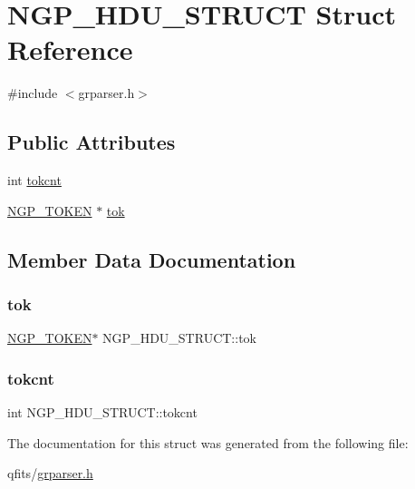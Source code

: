 \hypertarget{struct_n_g_p___h_d_u___s_t_r_u_c_t}{}\section{N\+G\+P\+\_\+\+H\+D\+U\+\_\+\+S\+T\+R\+U\+CT Struct Reference}
\label{struct_n_g_p___h_d_u___s_t_r_u_c_t}


{\ttfamily \#include $<$grparser.\+h$>$}

\subsection*{Public Attributes}
\begin{DoxyCompactItemize}
\item 
int \hyperlink{struct_n_g_p___h_d_u___s_t_r_u_c_t_a4bbc26892d6f45f03be904789ab45202}{tokcnt}
\item 
\hyperlink{grparser_8h_ab57b894304091236ced9238b8a7e21fd}{N\+G\+P\+\_\+\+T\+O\+K\+EN} $\ast$ \hyperlink{struct_n_g_p___h_d_u___s_t_r_u_c_t_a6c7032fdd7f78138bc39109632805c6b}{tok}
\end{DoxyCompactItemize}


\subsection{Member Data Documentation}
\mbox{\label{struct_n_g_p___h_d_u___s_t_r_u_c_t_a6c7032fdd7f78138bc39109632805c6b}} 
\subsubsection{\texorpdfstring{tok}{tok}}
{\footnotesize\ttfamily \hyperlink{grparser_8h_ab57b894304091236ced9238b8a7e21fd}{N\+G\+P\+\_\+\+T\+O\+K\+EN}$\ast$ N\+G\+P\+\_\+\+H\+D\+U\+\_\+\+S\+T\+R\+U\+C\+T\+::tok}

\mbox{\label{struct_n_g_p___h_d_u___s_t_r_u_c_t_a4bbc26892d6f45f03be904789ab45202}} 
\subsubsection{\texorpdfstring{tokcnt}{tokcnt}}
{\footnotesize\ttfamily int N\+G\+P\+\_\+\+H\+D\+U\+\_\+\+S\+T\+R\+U\+C\+T\+::tokcnt}



The documentation for this struct was generated from the following file\+:\begin{DoxyCompactItemize}
\item 
qfits/\hyperlink{grparser_8h}{grparser.\+h}\end{DoxyCompactItemize}
